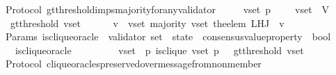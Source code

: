 \begin{isabellebody}
\isanewline
\isanewline
{}\isamarkupfalse%
\ {\isacharparenleft}\ Protocol{\isacharparenright}\ gt{\isacharunderscore}threshold{\isacharunderscore}imps{\isacharunderscore}majority{\isacharunderscore}for{\isacharunderscore}any{\isacharunderscore}validator\ {\isacharcolon}\isanewline
\ \ {\isachardoublequoteopen}{\isasymforall}\ {\isasymsigma}\ v{\isacharunderscore}set\ p{\isachardot}\ {\isasymsigma}\ {\isasymin}\ {\isasymSigma}\ {\isasymand}\ v{\isacharunderscore}set\ {\isasymsubseteq}\ V\isanewline
\ \ {\isasymlongrightarrow}\ gt{\isacharunderscore}threshold\ {\isacharparenleft}v{\isacharunderscore}set{\isacharcomma}\ {\isasymsigma}{\isacharparenright}\ \isanewline
\ \ {\isasymlongrightarrow}\ {\isacharparenleft}{\isasymforall}\ v\ {\isasymin}\ v{\isacharunderscore}set{\isachardot}\ majority\ {\isacharparenleft}v{\isacharunderscore}set{\isacharcomma}\ the{\isacharunderscore}elem\ {\isacharparenleft}L{\isacharunderscore}H{\isacharunderscore}J\ {\isasymsigma}\ v{\isacharparenright}{\isacharparenright}{\isacharparenright}{\isachardoublequoteclose}\isanewline
%
\isadelimproof
\ \ %
\endisadelimproof
%
\isatagproof
{}\isamarkupfalse%
%
\endisatagproof
{\isafoldproof}%
%
\isadelimproof
\isanewline
%
\endisadelimproof
\isanewline
\isanewline
\isanewline
\isanewline
{}\isamarkupfalse%
\ {\isacharparenleft}\ Params{\isacharparenright}\ is{\isacharunderscore}clique{\isacharunderscore}oracle\ {\isacharcolon}{\isacharcolon}\ {\isachardoublequoteopen}{\isacharparenleft}validator\ set\ {\isacharasterisk}\ state\ {\isacharasterisk}\ consensus{\isacharunderscore}value{\isacharunderscore}property{\isacharparenright}\ {\isasymRightarrow}\ bool{\isachardoublequoteclose}\isanewline
\ \ \isanewline
\ \ \ \ {\isachardoublequoteopen}is{\isacharunderscore}clique{\isacharunderscore}oracle\ \isanewline
\ \ \ \ \ \ \ {\isacharequal}\ {\isacharparenleft}{\isasymlambda}{\isacharparenleft}v{\isacharunderscore}set{\isacharcomma}\ {\isasymsigma}{\isacharcomma}\ p{\isacharparenright}{\isachardot}\ {\isacharparenleft}is{\isacharunderscore}clique\ {\isacharparenleft}v{\isacharunderscore}set{\isacharcomma}\ p{\isacharcomma}\ {\isasymsigma}{\isacharparenright}\ {\isasymand}\ gt{\isacharunderscore}threshold\ {\isacharparenleft}v{\isacharunderscore}set{\isacharcomma}\ {\isasymsigma}{\isacharparenright}{\isacharparenright}{\isacharparenright}{\isachardoublequoteclose}\isanewline
\isanewline
\isanewline
{}\isamarkupfalse%
\ {\isacharparenleft}\ Protocol{\isacharparenright}\ clique{\isacharunderscore}oracles{\isacharunderscore}preserved{\isacharunderscore}over{\isacharunderscore}message{\isacharunderscore}from{\isacharunderscore}non{\isacharunderscore}member\ {\isacharcolon}\isanewline

\end{isabellebody}
